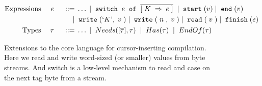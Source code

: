 
\begin{figure}
  \vspace{-5mm}
  \begin{displaymath}
    \begin{aligned}
      \textup{Expressions} && \; {e} \; && 
     \; ::= \; & \ldots \; | \; \; \texttt{switch} \;{}\; e\; \; \texttt{of} \;\; \overline{[{\; {K} \;} \Rightarrow {\; {e} \;}]} \; 
     \; | \; \; \texttt{start} \;(v) \; | \; \; \texttt{end} \;(v)
     \\     
     && && \; | \; & \; \texttt{write} \;(`K\textrm',\; v \;)
           \; | \; \; \texttt{write} \;(\; n \;,\; v \;)
           \; | \; \; \texttt{read} \;(\; v \;) \; | \;
      \; \texttt{finish} \;(e) \\      
      \textup{Types} && \; {\tau} \; && \; ::= \; & \ldots \; | \; \; Needs([\overline{\tau}],\tau) \; \; | \; \; Has(\tau) \; 
\; | \; \; EndOf(\tau) \; \\
    \end{aligned}
  \end{displaymath}
  \vspace{-4mm}
  \caption{Extensions to the core language for cursor-inserting compilation.
    Here we read and write word-sized (or smaller) values from byte streams. And
    switch is a low-level mechanism to read and case on the next tag byte from a
    stream.}
  \label{fig:target}
\end{figure}
